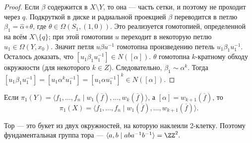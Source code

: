 \documentclass[12pt,a4paper]{article}
\begin{document}
\begin{proof}
        Если $\beta$ содержится в $X \setminus Y$, то она --- часть сетки, и поэтому не проходит через $q$. Подкруткой в диске и радиальной проекцией $\beta$ переводится в петлю $\beta_1 = \widehat{\alpha} \circ \theta$, где $\theta \in \Omega(S_1, (1, 0))$. Это реализуется гомотопией, определенной на всём $X \setminus \{q\}$; при этой гомотопии $u$ переходит в некоторую петлю $u_1 \in \Omega(Y, x_0)$. Значит петля $u \beta u^{-1}$ гомотопна произведению петель $u_1 \beta_1 u_1^{-1}$. Осталось доказать, что $[u_1 \beta_1 u_1^{-1}] \in N([\alpha])$. $\theta$ гомотопна $k$-кратному обходу окружности (для некоторого $k \in Z$). Следовательно, $\beta_1 \sim \alpha^k$. Тогда $[u_1 \beta_1 u_1^{-1}] = [u_1 \alpha^k u_1^{-1}] = [u_1 \alpha u_1^{-1}]^k \in N([\alpha])$.
    \end{proof}
    
    \begin{corollary}
        Если $\pi_1(Y) = \langle f_1, \dots, f_n \mid w_1(\overline{f}), \dots, w_k(\overline{f}) \rangle$, а $[\alpha] = w_{k+1}(\overline{f})$, то
        \[\pi_1(X) = \langle f_1, \dots, f_n \mid w_1(\overline{f}), \dots, w_{k+1}(\overline{f}) \rangle.\]
    \end{corollary}

    \begin{example}
        Тор --- это букет из двух окружностей, на которую наклеили 2-клетку. Поэтому фундаментальная группа тора --- $\langle a, b \mid a b a^{-1} b^{-1} \rangle = \ZZ^2.$
    \end{example}

    \begin{theorem}
        
    \end{theorem}


\end{document}
